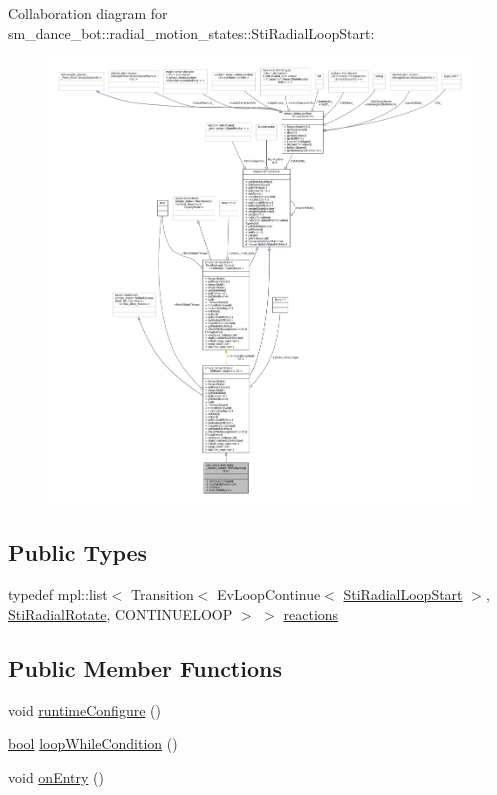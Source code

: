 Collaboration diagram for sm\+\_\+dance\+\_\+bot\+:\+:radial\+\_\+motion\+\_\+states\+:\+:Sti\+Radial\+Loop\+Start\+:
\nopagebreak
\begin{figure}[H]
\begin{center}
\leavevmode
\includegraphics[width=350pt]{structsm__dance__bot_1_1radial__motion__states_1_1StiRadialLoopStart__coll__graph}
\end{center}
\end{figure}
\subsection*{Public Types}
\begin{DoxyCompactItemize}
\item 
typedef mpl\+::list$<$ Transition$<$ Ev\+Loop\+Continue$<$ \hyperlink{structsm__dance__bot_1_1radial__motion__states_1_1StiRadialLoopStart}{Sti\+Radial\+Loop\+Start} $>$, \hyperlink{structsm__dance__bot_1_1radial__motion__states_1_1StiRadialRotate}{Sti\+Radial\+Rotate}, C\+O\+N\+T\+I\+N\+U\+E\+L\+O\+OP $>$ $>$ \hyperlink{structsm__dance__bot_1_1radial__motion__states_1_1StiRadialLoopStart_a817d8c91080ccf4ff0f387455d26f94c}{reactions}
\end{DoxyCompactItemize}
\subsection*{Public Member Functions}
\begin{DoxyCompactItemize}
\item 
void \hyperlink{structsm__dance__bot_1_1radial__motion__states_1_1StiRadialLoopStart_a5d61523a7767c515712bd2ec23e27571}{runtime\+Configure} ()
\item 
\hyperlink{classbool}{bool} \hyperlink{structsm__dance__bot_1_1radial__motion__states_1_1StiRadialLoopStart_a05d31b8062dae8eccc4d66ab21a0b720}{loop\+While\+Condition} ()
\item 
void \hyperlink{structsm__dance__bot_1_1radial__motion__states_1_1StiRadialLoopStart_a83662aeb4d86fe809ea02bc186e32415}{on\+Entry} ()
\end{DoxyCompactItemize}
